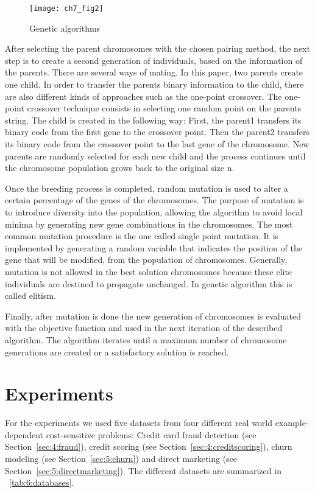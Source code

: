 \begin{figure}[t]
  \centering
  \texttt{[image: ch7\_fig2]}  
  \caption{Genetic algorithms \citep{Haupt2004}}
  \label{fig:7:geneticalgorithms}
\end{figure}
  
After selecting the parent chromosomes with the chosen pairing method, the next step is to create a 
second generation of individuals, based on the information of the parents. There are several ways 
of 
mating. In this paper, two parents create one child. 
In order to transfer the parents binary information to the child, there are also different kinds 
of approaches such as the one-point crossover. The one-point crossover technique consists in 
selecting one random point on the parents string. The child is created in the following way: First, 
the parent1 transfers its binary code from the first gene to the crossover point. Then the parent2 
transfers its binary code from the crossover point to the last gene of the chromosome. New parents 
are randomly selected for each new child and the process continues until the chromosome population 
grows back to the original size n. 

Once the breeding process is completed, random mutation is used to alter a certain percentage of 
the 
genes of the chromosomes. The purpose of mutation is to introduce diversity into the population, 
allowing the algorithm to avoid local minima by generating new gene combinations in the 
chromosomes. 
The most common mutation procedure is the one called single point mutation. It is implemented by 
generating a random variable that indicates the position of the gene that will be modified, from 
the 
population of chromosomes. Generally, mutation is not allowed in the best solution chromosomes 
because these elite individuals are destined to propagate unchanged. In genetic algorithm this 
is called elitism.

Finally, after mutation is done the new generation of chromosomes is evaluated with the objective 
function and used in the next iteration of the described algorithm.
The algorithm iterates until a maximum number of chromosome generations are created or a 
satisfactory solution is reached.


\section{Experiments}
\label{sec:7:results}

For the experiments we used five datasets from four different real world example-dependent 
cost-sensitive problems: Credit card fraud detection (see Section~\ref{sec:4:fraud}), credit 
scoring (see Section~\ref{sec:4:creditscoring}), churn modeling (see Section~\ref{sec:5:churn}) and 
direct marketing (see Section~\ref{sec:5:directmarketing}). The different datasets are summarized 
in \tablename{~\ref{tab:6:databases}}.


